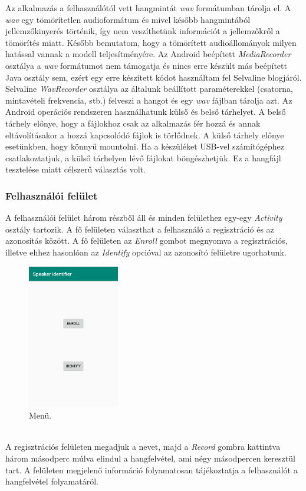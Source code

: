 Az alkalmazás a felhasználótól vett hangmintát \emph{wav} formátumban tárolja el. A \emph{wav} egy tömörítetlen audioformátum és mivel később hangmintából jellemzőkinyerés történik, így nem veszíthetünk információt a jellemzőkről a tömörítés miatt. Később bemutatom, hogy a tömörített audioállományok milyen hatással vannak a modell teljesítményére.
\newline
\newline
Az Android beépített \emph{MediaRecorder} osztálya a \emph{wav} formátumot nem támogatja és nincs erre készült más beépített Java osztály sem, ezért egy erre készített kódot használtam fel Selvaline blogjáról. Selvaline \emph{WavRecorder} osztálya az általunk beállított paraméterekkel (csatorna, mintavételi frekvencia, stb.) felveszi a hangot és egy \emph{wav} fájlban tárolja azt.
\newline
\newline
Az Android operációs rendszeren használhatunk külső és belső tárhelyet. A belső tárhely előnye, hogy a fájlokhoz csak az alkalmazás fér hozzá és annak eltávolításakor a hozzá kapcsolódó fájlok is törlődnek. A külső tárhely előnye esetünkben, hogy könnyű mountolni. Ha a készüléket USB-vel számítógéphez csatlakoztatjuk, a külső tárhelyen lévő fájlokat böngészhetjük. Ez a hangfájl tesztelése miatt célszerű választás volt. 



\subsubsection{Felhasználói felület}

 A felhasználói felület három részből áll és minden felülethez egy-egy \emph{Activity} osztály tartozik. A fő felületen választhat a felhasználó a regisztráció és az azonosítás között. A fő felületen az \emph{Enroll} gombot megnyomva a regisztrációs, illetve ehhez hasonlóan az \emph{Identify} opcióval az azonosító felületre ugorhatunk.


\begin{figure}[!ht]
	\centering
	\includegraphics[width=40mm, keepaspectratio]{figures/app-main-screen.png}
	\caption{Menü.}
	\label{fig:app-main-screen}
\end{figure}
\ \\
A regisztrációs felületen megadjuk a nevet, majd a \emph{Record} gombra kattintva három másodperc múlva elindul a hangfelvétel, ami négy másodpercen keresztül tart. A felületen megjelenő információ folyamatosan tájékoztatja a felhasználót a hangfelvétel folyamatáról.

